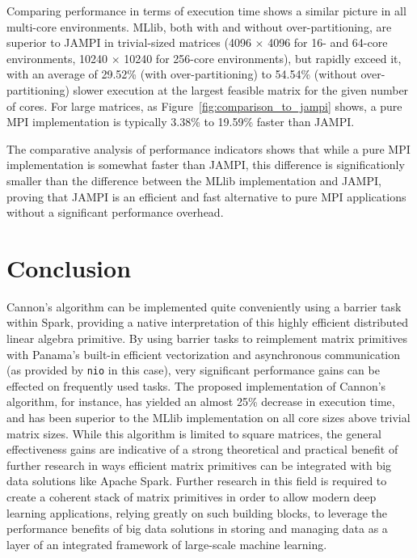 \documentclass[fleqn,10pt]{SelfArx} %
\begin{document}
Comparing performance in terms of execution time shows a similar picture in all multi-core environments. MLlib, both with and without over-partitioning, are superior to JAMPI in trivial-sized matrices (4096 $\times$ 4096 for 16- and 64-core environments, 10240 $\times$ 10240 for 256-core environments), but rapidly exceed it, with an average of 29.52\% (with over-partitioning) to 54.54\% (without over-partitioning) slower execution at the largest feasible matrix for the given number of cores. For large matrices, as Figure~\ref{fig:comparison_to_jampi} shows, a pure MPI implementation is typically 3.38\% to 19.59\% faster than JAMPI. 

The comparative analysis of performance indicators shows that while a pure MPI implementation is somewhat faster than JAMPI, this difference is significationly smaller than the difference between the MLlib implementation and JAMPI, proving that JAMPI is an efficient and fast alternative to pure MPI applications without a significant performance overhead.





\section{Conclusion} %
\label{sec:conclusion}

Cannon's algorithm can be implemented quite conveniently using a barrier task within Spark, providing a native interpretation of this highly efficient distributed linear algebra primitive. By using barrier tasks to reimplement matrix primitives with Panama's built-in efficient vectorization and asynchronous communication (as provided by \texttt{nio} in this case), very significant performance gains can be effected on frequently used tasks. The proposed implementation of Cannon's algorithm, for instance, has yielded an almost 25\% decrease in execution time, and has been superior to the MLlib implementation on all core sizes above trivial matrix sizes. While this algorithm is limited to square matrices, the general effectiveness gains are indicative of a strong theoretical and practical benefit of further research in ways efficient matrix primitives can be integrated with big data solutions like Apache Spark. Further research in this field is required to create a coherent stack of matrix primitives in order to allow modern deep learning applications, relying greatly on such building blocks, to leverage the performance benefits of big data solutions in storing and managing data as a layer of an integrated framework of large-scale machine learning.
\end{document}
